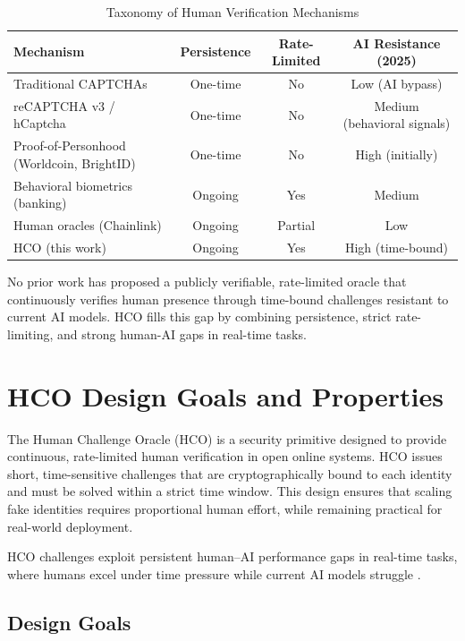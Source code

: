 \documentclass[sigconf,nonacm]{acmart}
\begin{document}
\begin{table}[t]
	\centering
	\caption{Taxonomy of Human Verification Mechanisms}
	\label{tab:hco-taxonomy}
	\begin{tabular}{lccc}
		\toprule
		Mechanism & Persistence & Rate-Limited & AI Resistance (2025) \\
		\midrule
		Traditional CAPTCHAs \cite{vonahn2003captcha} & One-time & No & Low (AI bypass) \\
		reCAPTCHA v3 / hCaptcha \cite{reCAPTCHA2019} & One-time & No & Medium (behavioral signals) \\
		Proof-of-Personhood (Worldcoin, BrightID) \cite{worldcoin2023} & One-time & No & High (initially) \\
		Behavioral biometrics (banking) \cite{biometrics2021} & Ongoing & Yes & Medium \\
		Human oracles (Chainlink) \cite{ellis2017chainlink} & Ongoing & Partial & Low \\
		HCO (this work) & Ongoing & Yes & High (time-bound) \\
		\bottomrule
	\end{tabular}
\end{table}

No prior work has proposed a publicly verifiable, rate-limited oracle that continuously verifies human presence through time-bound challenges resistant to current AI models. HCO fills this gap by combining persistence, strict rate-limiting, and strong human-AI gaps in real-time tasks.

\section{HCO Design Goals and Properties}

The Human Challenge Oracle (HCO) is a security primitive designed to provide continuous, rate-limited human verification in open online systems. HCO issues short, time-sensitive challenges that are cryptographically bound to each identity and must be solved within a strict time window. This design ensures that scaling fake identities requires proportional human effort, while remaining practical for real-world deployment.

HCO challenges exploit persistent human--AI performance gaps in real-time tasks, where humans excel under time pressure while current AI models struggle \cite{geirhos2018generalisation,brendel2019approximating}.

\subsection{Design Goals}
\end{document}
